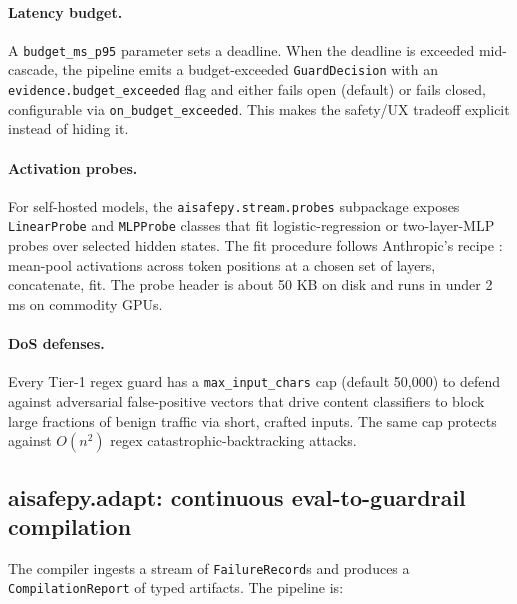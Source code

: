 \paragraph{Latency budget.} A \texttt{budget\_ms\_p95} parameter
sets a deadline. When the deadline is exceeded mid-cascade, the
pipeline emits a budget-exceeded \texttt{GuardDecision} with an
\texttt{evidence.budget\_exceeded} flag and either fails open
(default) or fails closed, configurable via \texttt{on\_budget\_exceeded}.
This makes the safety/UX tradeoff explicit instead of hiding it.

\paragraph{Activation probes.} For self-hosted models, the
\texttt{aisafepy.stream.probes} subpackage exposes
\texttt{LinearProbe} and \texttt{MLPProbe} classes that fit
logistic-regression or two-layer-MLP probes over selected hidden
states. The fit procedure follows Anthropic's recipe
\citep{anthropicprobes}: mean-pool activations across token
positions at a chosen set of layers, concatenate, fit. The probe
header is about 50 KB on disk and runs in under 2 ms on commodity
GPUs.

\paragraph{DoS defenses.} Every Tier-1 regex guard has a
\texttt{max\_input\_chars} cap (default 50,000) to defend against
adversarial false-positive vectors that drive content classifiers
to block large fractions of benign traffic via short, crafted
inputs. The same cap protects against $O(n^2)$ regex
catastrophic-backtracking attacks.

\subsection{aisafepy.adapt: continuous eval-to-guardrail compilation}

The compiler ingests a stream of \texttt{FailureRecord}s and
produces a \texttt{CompilationReport} of typed artifacts. The
pipeline is:

